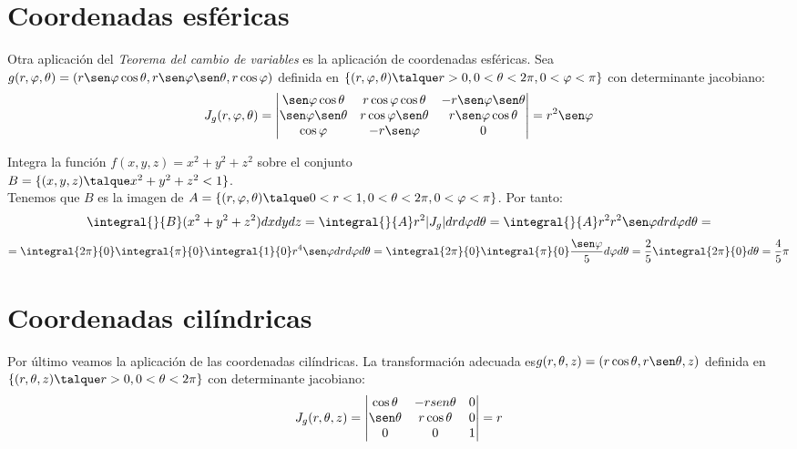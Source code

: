 \section{Coordenadas esféricas} 
\begin{proposicion} Otra aplicación del \textit{Teorema del cambio de variables} es la aplicación de coordenadas esféricas. Sea $g(r,\varphi,\theta)=(r\sen\varphi\cos\theta,r\sen\varphi\sen\theta, r\cos\varphi)$ definida en $\{(r,\varphi,\theta)\talque r>0, 0<\theta<2\pi, 0<\varphi<\pi\}$ con determinante jacobiano:
\[J_g(r,\varphi,\theta)=\left|\begin{matrix}\sen\varphi\cos\theta & r\cos\varphi\cos\theta & -r\sen\varphi\sen\theta \\ \sen\varphi\sen\theta & r\cos\varphi\sen\theta & r\sen\varphi\cos\theta\\ \cos\varphi & -r\sen\varphi & 0\end{matrix}\right|=r^2\sen\varphi\]
\end{proposicion}

\begin{ejem} Integra la función $f(x,y,z)=x^2+y^2+z^2$ sobre el conjunto\\
$B=\{(x,y,z)\talque x^2+y^2+z^2<1\}$.\\
Tenemos que $B$ es la imagen de $A=\{(r,\varphi,\theta)\talque 0<r<1, 0<\theta<2\pi,0<\varphi<\pi\}$. Por tanto:
\[\integral{}{B}(x^2+y^2+z^2)dxdydz=\integral{}{A}r^2|J_g|drd\varphi d\theta=\integral{}{A}r^2r^2\sen\varphi drd\varphi d\theta=\]\[=\integral{2\pi}{0}\integral{\pi}{0}\integral{1}{0}r^4\sen\varphi drd\varphi d\theta=\integral{2\pi}{0}\integral{\pi}{0}\dfrac{\sen\varphi}{5}d\varphi d\theta=\dfrac{2}{5}\integral{2\pi}{0}d\theta=\dfrac{4}{5}\pi\]
\end{ejem}

\section{Coordenadas cilíndricas} 
\begin{proposicion} Por último veamos la aplicación de las coordenadas cilíndricas. La transformación adecuada es$g(r,\theta,z)=(r\cos\theta,r\sen\theta, z)$ definida en $\{(r,\theta,z)\talque r>0, 0<\theta<2\pi\}$ con determinante jacobiano:
\[J_g(r,\theta,z)=\left|\begin{matrix}\cos\theta & -r sen\theta & 0 \\ \sen\theta & r\cos\theta & 0\\ 0 & 0 & 1\end{matrix}\right|=r\]
\end{proposicion}

